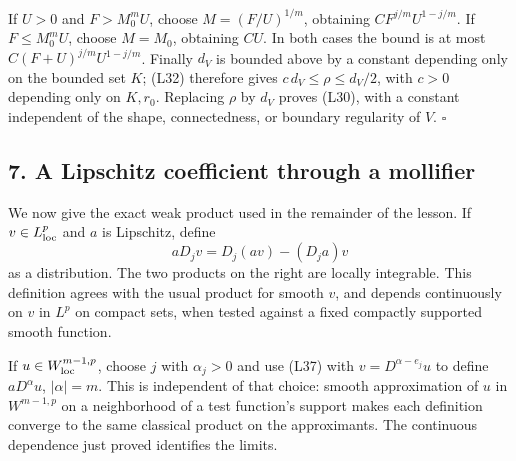 \documentclass[
  11pt,
]{article}
\makeatletter
\let\ReaderOriginalAnchorStart\hyper@anchorstart
\let\ReaderOriginalAnchorEnd\hyper@anchorend
\let\ReaderPendingAliases\@empty
\def\ReaderArmAliases#1{\gdef\ReaderPendingAliases{#1}}
\def\hyper@anchorstart#1{\ReaderIfNativeAnchorTF{#1}{\ReaderPendingAliases\global\let\ReaderPendingAliases\@empty}{}\ReaderOriginalAnchorStart{#1}}
\makeatother
\begin{document}
If \(U>0\) and \(F>M_0^mU\), choose \(M=(F/U)^{1/m}\), obtaining
\(C F^{j/m}U^{1-j/m}\). If \(F\leq M_0^mU\), choose \(M=M_0\), obtaining
\(CU\). In both cases the bound is at most \(C(F+U)^{j/m}U^{1-j/m}\).
Finally \(d_V\) is bounded above by a constant depending only on the
bounded set \(K\); (L32) therefore gives \(c\,d_V\leq\rho\leq d_V/2\),
with \(c>0\) depending only on \(K,r_0\). Replacing \(\rho\) by \(d_V\)
proves (L30), with a constant independent of the shape, connectedness,
or boundary regularity of \(V\). \(\square\)

\ReaderArmAliases{\ReaderOriginalAnchorStart{AN03-LCE-007}\ReaderOriginalAnchorEnd\begingroup\expandafter\def\csname @currentHref\endcsname{AN03-LCE-007}\label{AN03-LCE-007}\endgroup\ReaderOriginalAnchorStart{an03-lce-007-a-lipschitz-coefficient-through-a-mollifier}\ReaderOriginalAnchorEnd\begingroup\expandafter\def\csname @currentHref\endcsname{an03-lce-007-a-lipschitz-coefficient-through-a-mollifier}\label{an03-lce-007-a-lipschitz-coefficient-through-a-mollifier}\endgroup\ReaderOriginalAnchorStart{7-a-lipschitz-coefficient-through-a-mollifier}\ReaderOriginalAnchorEnd\begingroup\expandafter\def\csname @currentHref\endcsname{7-a-lipschitz-coefficient-through-a-mollifier}\label{7-a-lipschitz-coefficient-through-a-mollifier}\endgroup\ReaderOriginalAnchorStart{a-lipschitz-coefficient-through-a-mollifier}\ReaderOriginalAnchorEnd}
\subsection{7. A Lipschitz coefficient through a
mollifier}\label{a-lipschitz-coefficient-through-a-mollifier}

We now give the exact weak product used in the remainder of the lesson.
If \(v\in L^p_{\rm loc}\) and \(a\) is Lipschitz, define \[
aD_jv=D_j(av)-(D_ja)v                                             \tag{L37}
\] as a distribution. The two products on the right are locally
integrable. This definition agrees with the usual product for smooth
\(v\), and depends continuously on \(v\) in \(L^p\) on compact sets,
when tested against a fixed compactly supported smooth function.

If \(u\in W^{m-1,p}_{\rm loc}\), choose \(j\) with \(\alpha_j>0\) and
use (L37) with \(v=D^{\alpha-e_j}u\) to define \(aD^\alpha u\),
\(|\alpha|=m\). This is independent of that choice: smooth approximation
of \(u\) in \(W^{m-1,p}\) on a neighborhood of a test function's support
makes each definition converge to the same classical product on the
approximants. The continuous dependence just proved identifies the
limits.
\end{document}

